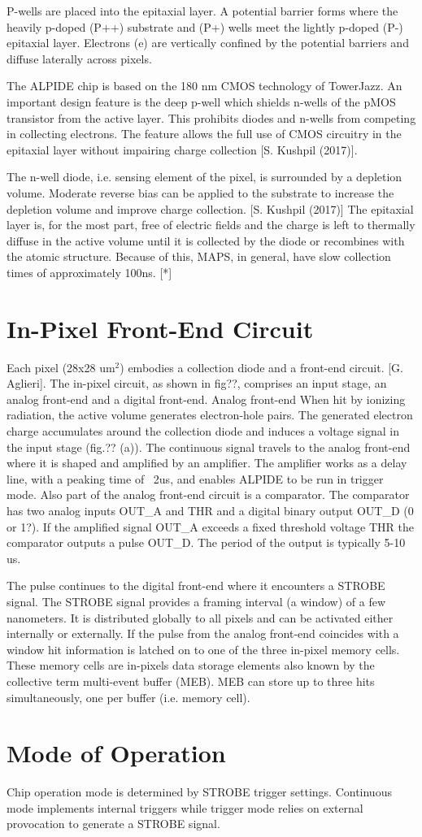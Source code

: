 P-wells are placed into the epitaxial layer.
A potential barrier forms where the heavily p-doped (P++) substrate and (P+) wells meet the lightly p-doped (P-) epitaxial layer.
Electrons (e) are vertically confined by the potential barriers and diffuse laterally across pixels.

The ALPIDE chip is based on the 180 nm CMOS technology of TowerJazz.
An important design feature is the deep p-well which shields n-wells of the pMOS transistor from the active layer.
This prohibits diodes and n-wells from competing in collecting electrons.
The feature allows the full use of CMOS circuitry in the epitaxial layer without impairing charge collection [S. Kushpil (2017)].

The n-well diode, i.e. sensing element of the pixel, is surrounded by a depletion volume.
Moderate reverse bias can be applied to the substrate to increase the depletion volume and improve charge collection. [S. Kushpil (2017)]
The epitaxial layer is, for the most part, free of electric fields and the charge is left to thermally diffuse in the active volume until it is collected by the diode or recombines with the atomic structure. Because of this, MAPS, in general, have slow collection times of approximately 100ns. [*]



\section{In-Pixel Front-End Circuit}
Each pixel (28x28 um$^2$) embodies a collection diode and a front-end circuit.  [G. Aglieri].
The in-pixel circuit, as shown in fig??, comprises an input stage, an analog front-end and a digital front-end.
Analog front-end
When hit by ionizing radiation, the active volume generates electron-hole pairs.
The generated electron charge accumulates around the collection diode and induces a voltage signal in the input stage (fig.?? (a)).
The continuous signal travels to the analog front-end where it is shaped and amplified by an amplifier. The amplifier works as a delay line, with a peaking time of ~2us, and enables ALPIDE to be run in trigger mode.
Also part of the analog front-end circuit is a comparator.
The comparator has two analog inputs OUT\_A and THR and a digital binary output OUT\_D (0 or 1?).
If the amplified signal OUT\_A exceeds a fixed threshold voltage THR the comparator outputs a pulse OUT\_D. The period of the output is typically 5-10 us.

The pulse continues to the digital front-end where it encounters a STROBE signal.
The STROBE signal provides a framing interval (a window) of a few nanometers.
It is distributed globally to all pixels and can be activated either internally or externally.
If the pulse from the analog front-end coincides with a window hit information is latched on to one of the three in-pixel memory cells.
These memory cells are in-pixels data storage elements also known by the collective term multi-event buffer (MEB). MEB can store up to three hits simultaneously, one per buffer (i.e. memory cell).

\section{Mode of Operation}
Chip operation mode is determined by STROBE trigger settings.
Continuous mode implements internal triggers while trigger mode relies on external provocation to generate a STROBE signal.
